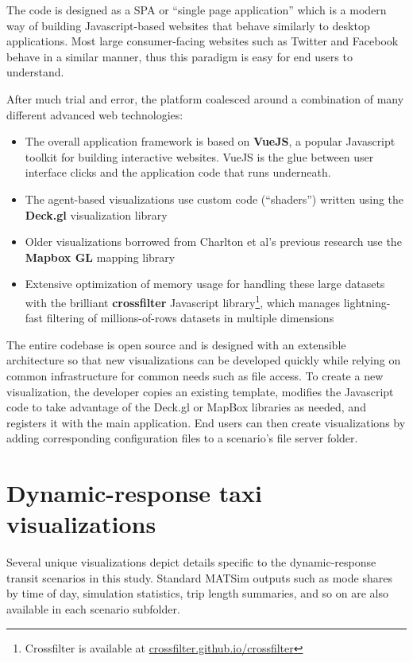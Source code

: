The code is designed as a \gls{SPA} or ``single page application'' which is a modern way of building Javascript-based websites that behave similarly to desktop applications. Most large consumer-facing websites such as Twitter and Facebook behave in a similar manner, thus this paradigm is easy for end users to understand.

After much trial and error, the platform coalesced around a combination of many different advanced web technologies:

\begin{itemize}
  \item The overall application framework is based on \textbf{VueJS}, a popular Javascript toolkit for building interactive websites. VueJS is the glue between user interface clicks and the application code that runs underneath.
  \item The agent-based visualizations use custom code (``shaders'') written using the \textbf{Deck.gl} visualization library
  \item Older visualizations borrowed from Charlton et al's previous research use the \textbf{Mapbox GL} mapping library
  \item Extensive optimization of memory usage for handling these large datasets with the brilliant \textbf{crossfilter} Javascript library\footnote{Crossfilter is available at \href{https://crossfilter.github.io/crossfilter/}{crossfilter.github.io/crossfilter}}, which manages lightning-fast filtering of millions-of-rows datasets in multiple dimensions
\end{itemize}

The entire codebase is open source and is designed with an extensible architecture so that new visualizations can be developed quickly while relying on common infrastructure for common needs such as file access. To create a new visualization, the developer copies an existing template, modifies the Javascript code to take advantage of the Deck.gl or MapBox libraries as needed, and registers it with the main application. End users can then create visualizations by adding corresponding configuration files to a scenario's file server folder.

\section{Dynamic-response taxi visualizations}
\label{avov-drtviz}

Several unique visualizations depict details specific to the dynamic-response transit scenarios in this study. Standard MATSim outputs such as mode shares by time of day, simulation statistics, trip length summaries, and so on are also available in each scenario subfolder.

